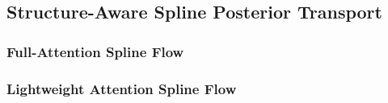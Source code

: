 \documentclass{article}
\begin{document}

\subsection{Structure-Aware Spline Posterior Transport}
\label{sec:spline_flow}

%
%
%
%
%
%
%
%
%
%
%
%
%


\subsubsection{Full-Attention Spline Flow}
\label{sec:full_attention_spline}

%
%
%
%
%
%


\subsubsection{Lightweight Attention Spline Flow}
\label{sec:light_attention_spline}

%
%
%
%
%
%
%
%
%
%
%
%
%
%
%
%
%
%
\end{document}
